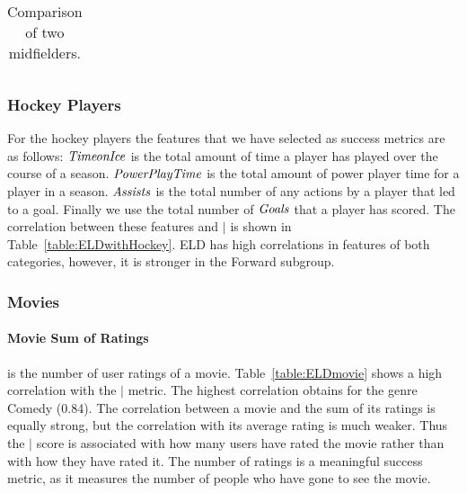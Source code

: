 {\begin{table}[htbp]
{\begin{tabular}{llccccccc}
				\end{tabular}}
				\caption{Comparison of two midfielders.\label{table:MidfielderComparison}}
			\end{table}

	
	
						
						\begin{table}
						
						
							\centering
									\caption{Correlation between $\mid$ metric and success metrics of NHL Players.	\label{table:ELDwithHockey}}
							\end{table}
	\subsubsection{Hockey Players}
	For the hockey players the features that we have selected as success metrics are as follows: $\it{Time on Ice}$ is the total amount of time a player has played over the course of a season. $\it{Power Play Time}$ is the total amount of power player time for a player in a season. $\it{Assists}$ is the total number of any actions by a player that led to a goal. Finally we use the total number of $\it{Goals}$ that a player has scored.
The correlation between these features and $\mid$ is shown in Table~\ref{table:ELDwithHockey}. ELD has high correlations in features of both categories, however, it is stronger in the Forward subgroup.
	\subsubsection{Movies} 
	
	\paragraph{Movie Sum of Ratings} is the number of user ratings of a movie. Table~\ref{table:ELDmovie} shows a high correlation with the $\mid$ metric. The highest correlation obtains for the genre Comedy (0.84). 
	The correlation between a movie and the sum of its ratings is equally strong, but the correlation with its average rating is much weaker. Thus the $\mid$ score is associated with how many users have rated the movie rather than with how they have rated it. The number of ratings is a meaningful success metric, as it measures the number of people who have gone to see the movie.  
	

}
